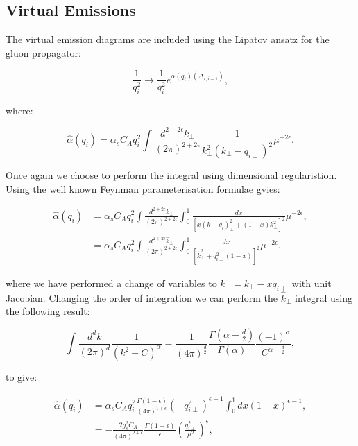 		\subsection{Virtual Emissions}
		\label{sub:subsection_name}

			The virtual emission diagrams are included using the Lipatov ansatz for the gluon propagator:

			\begin{equation}
			\frac{1}{q_i^2}\longrightarrow\frac{1}{q_i^2}e^{\hat{\alpha}(q_i)(\Delta_{i,i-1})},
			\end{equation}

			where:

			\begin{equation}
			\hat{\alpha}(q_i) = \alpha_sC_Aq_i^2\int \frac{d^{2+2\epsilon}k_{\perp}}{(2\pi)^{2+2\epsilon}}\frac{1}{k^2_\perp(k_\perp - q_{i\perp})^2}\mu^{-2\epsilon}.
			\end{equation}

			Once again we choose to perform the integral using dimensional regularistion.  Using the well known Feynman parameterisation formulae gvies:

			\begin{align}
			\hat{\alpha}(q_i) &= \alpha_sC_Aq_i^2\int \frac{d^{2+2\epsilon}k_{\perp}}{(2\pi)^{2+2\epsilon}}\int_0^1 \frac{dx}{[x(k - q_{i})^2_\perp + (1-x)k_\perp^2]^2}\mu^{-2\epsilon}, \\
												&= \alpha_sC_Aq_i^2\int \frac{d^{2+2\epsilon}\hat{k}_{\perp}}{(2\pi)^{2+2\epsilon}}\int_0^1 \frac{dx}{[\hat{k}^2 _\perp + q_{i\perp}^2(1-x)]^2}\mu^{-2\epsilon},
			\end{align}

			where we have performed a change of variables to $\hat{k}_\perp = k_\perp - xq_{i\perp}$ with unit Jacobian.  Changing the order of integration we can perform the $\hat{k}_\perp$ integral using the following result:

			\begin{equation}
			\int \frac{d^dk}{(2\pi)^d}\frac{1}{(k^2 - C)^\alpha} = \frac{1}{(4\pi)^{\frac{d}{2}}}\frac{\Gamma(\alpha - \frac{d}{2})}{\Gamma(\alpha)}\frac{(-1)^\alpha}{C^{\alpha - \frac{d}{2}}},
			\end{equation}

			to give:

			\begin{align}
			\hat{\alpha}(q_i) &= \alpha_sC_Aq_i^2\frac{\Gamma(1-\epsilon)}{(4\pi)^{1+\epsilon}}(-q_{i\perp}^2)^{\epsilon-1}\int_0^1 dx(1-x)^{\epsilon-1}, \\
												&= -\frac{2g_s^2C_A}{(4\pi)^{2+\epsilon}}\frac{\Gamma(1-\epsilon)}{\epsilon}\left(\frac{q_{i\perp}^2}{\mu^2}\right)^\epsilon,
			\end{align}

